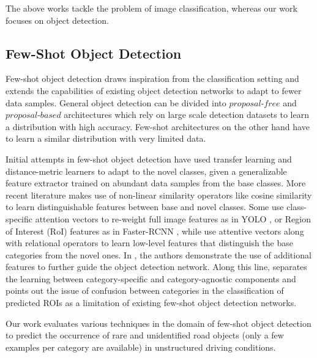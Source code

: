 \documentclass[letterpaper]{article} %
\begin{document}
The above works tackle the problem of image classification, whereas our work focuses on object detection.

\subsection{Few-Shot Object Detection}
\label{related:fsod}
Few-shot object detection draws inspiration from the classification setting and extends the capabilities of existing object detection networks \cite{yolo2,faster-rcnn} to adapt to fewer data samples. General object detection can be divided into $proposal$-$free$ \cite{yolo2,retinanet,polyyolo} and $proposal$-$based$ \cite{faster-rcnn,fpn} architectures which rely on large scale detection datasets to learn a distribution with high accuracy. Few-shot architectures on the other hand have to learn a similar distribution with very limited data.

Initial attempts in few-shot object detection have used transfer learning \cite{lstd} and distance-metric learners \cite{repmet} to adapt to the novel classes, given a generalizable feature extractor trained on abundant data samples from the base classes. More recent literature makes use of non-linear similarity operators like cosine similarity \cite{fsdet} to learn distinguishable features between base and novel classes. Some use class-specific attention vectors to re-weight full image features as in YOLO \cite{reweight}, or Region of Interest (RoI) features as in Faster-RCNN \cite{metarcnn}, while \cite{fgn,fsod} use attentive vectors along with relational operators \cite{relation-net} to learn low-level features that distinguish the base categories from the novel ones. In \cite{addfeat}, the authors demonstrate the use of additional features to further guide the object detection network.
Along this line, \cite{metadet} separates the learning between category-specific and category-agnostic components and points out the issue of confusion between categories in the classification of predicted ROIs as a limitation of existing few-shot object detection networks.

Our work evaluates various techniques in the domain of few-shot object detection to predict the occurrence of rare and unidentified road objects (only a few examples per category are available) in unstructured driving conditions.

\end{document}
